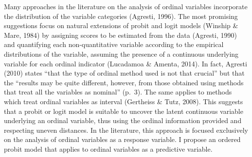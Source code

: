 \documentclass[12pt,econ]{sources/authesis}
\begin{document}
Many approaches in the literature on the analysis of ordinal variables incorporate the distribution of the variable categories (Agresti, 1996). The most promising suggestions focus on natural extensions of probit and logit models (Winship \& Mare, 1984) by assigning scores to be estimated from the data (Agresti, 1990) and quantifying each non-quantitative variable according to the empirical distributions of the variable, assuming the presence of a continuous underlying variable for each ordinal indicator (Lucadamoa \& Amenta, 2014). In fact, Agresti (2010) states ``that the type of ordinal method used is not that crucial'' but that the ``results may be quite different, however, from those obtained using methods that treat all the variables as nominal'' (p.~3). The same applies to methods which treat ordinal variables as interval (Gertheiss \& Tutz, 2008). This suggests that a probit or logit model is suitable to uncover the latent continuous variable underlying an ordinal variable, thus using the ordinal information provided and respecting uneven distances. In the literature, this approach is focused exclusively on the analysis of ordinal variables as a response variable. I propose an ordered probit model that applies to ordinal variables as a predictive variable.
\end{document}
